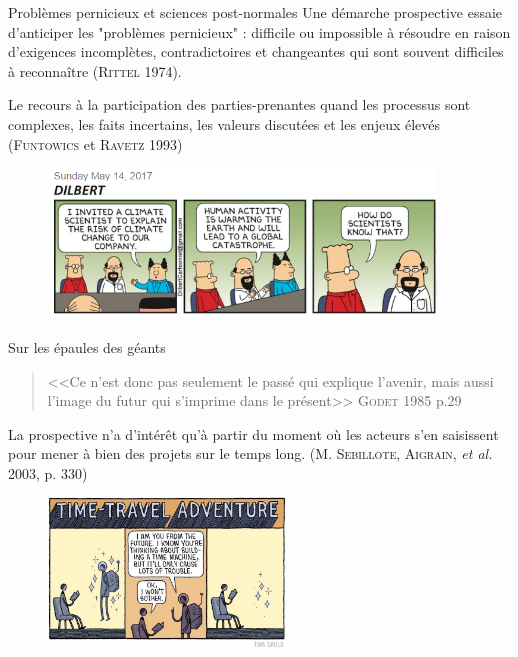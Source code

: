 \documentclass[newPxFont]{beamer}
\begin{document}
\begin{frame}[c]{Problèmes pernicieux et sciences post-normales}
  \vspace{-2em}
  Une démarche prospective essaie d'anticiper les "problèmes pernicieux" :  difficile ou impossible à résoudre en raison d'exigences incomplètes, contradictoires et changeantes qui sont souvent difficiles à reconnaître (\textsc{Rittel} 1974).

  Le recours à la participation des parties-prenantes quand les processus sont complexes, les faits incertains, les valeurs discutées et les enjeux élevés (\textsc{Funtowics} et \textsc{Ravetz} 1993)

  \begin{figure}
   \includegraphics[height=4cm]{img/a_dilbert-climate-science.png}
  \end{figure}
\end{frame}

\begin{frame}[c]{Sur les épaules des géants}
  \vspace{-2em}
  \begin{quote}
    <<Ce n'est donc pas seulement le passé qui explique l'avenir, mais aussi l'image du futur qui s'imprime dans le présent>>
    \hspace*{\fill}\textsc{Godet} 1985 p.29
  \end{quote}
  La prospective n'a d'intérêt qu'à partir du moment où les acteurs s'en saisissent pour mener à bien des projets sur le temps long. (\textsc{M. Sebillote, Aigrain}, \textit{et al.} 2003, p. 330)
  \begin{figure}
   \includegraphics[height=4cm]{img/a_thom_gauld_futureMachine.jpg}
  \end{figure}
\end{frame}
\end{document}

